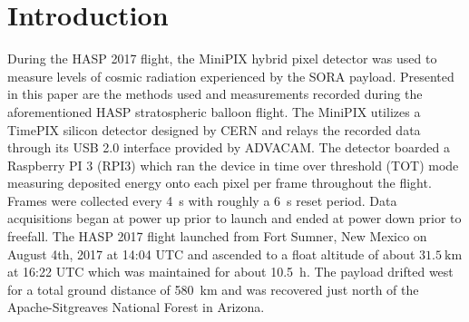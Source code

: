 \section{Introduction}
\label{Introduction}

During the HASP 2017\cite{hasp} flight, the MiniPIX hybrid pixel detector\cite{minipix} was used to measure levels of cosmic radiation experienced by 
the SORA payload\cite{sora}. Presented in this paper are the methods used and measurements recorded during the aforementioned HASP stratospheric balloon flight. 
The MiniPIX utilizes a TimePIX\cite{timepix} silicon detector designed by CERN\cite{cern} and relays the recorded data through its USB 2.0 interface provided by 
ADVACAM\cite{advacam}. The detector boarded a Raspberry PI 3 (RPI3) which ran the device in time over threshold (TOT) mode measuring deposited energy onto each 
pixel per frame throughout the flight. Frames were collected every \SI{4}{\second} with roughly a \SI{6}{\second} reset period. Data acquisitions began at power 
up prior to launch and ended at power down prior to freefall. The HASP 2017 flight launched from Fort Sumner, New Mexico on August 4th, 2017 at 14:04 UTC 
and ascended to a float altitude of about $\SI{31.5}{\kilo\meter}$ at 16:22 UTC which was maintained for about \SI{10.5}{\hour}. The payload drifted west 
for a total ground distance of \SI{580}{\kilo\meter} and was recovered just north of the Apache-Sitgreaves National Forest in Arizona.